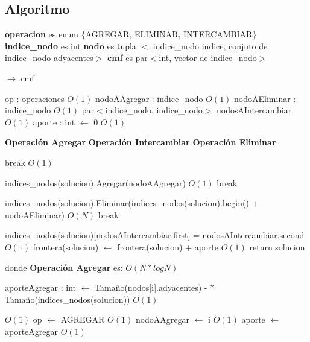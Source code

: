 \documentclass[a4paper, 10pt, twoside]{article}
\newenvironment{pseudo}[1][]{%
    \vspace{1em}%
    \begin{algorithmic}%
}
{%
    \end{algorithmic}%
    \vspace{1em}%
}
\newcommand{\Ode}[1]{\hfill $O(#1)$}
\begin{document}
\subsection{Algoritmo}

\begin{pseudo}

\State \textbf{operacion} es enum $\lbrace$AGREGAR, ELIMINAR, INTERCAMBIAR$\rbrace$
\State \textbf{indice\_nodo} es int
\State \textbf{nodo} es tupla $<$ indice\_nodo indice, conjuto de indice\_nodo adyacentes$>$
\State \textbf{cmf} es par$<$int, vector de indice\_nodo$>$

\State
{} $\rightarrow$ cmf
	
	\State op : operaciones 																	\Ode{1}
	\State nodoAAgregar	: indice\_nodo 															\Ode{1}
	\State nodoAEliminar : indice\_nodo															\Ode{1}
	\State par$<$indice\_nodo, indice\_nodo$>$ nodosAIntercambiar								\Ode{1}
	\State aporte : int  $\leftarrow$ 0															\Ode{1}

	\State
	\State \textbf{Operación Agregar}
	\State
	\State \textbf{Operación Intercambiar}
	\State
	\State \textbf{Operación Eliminar}
	\State

	 break \EndIf																\Ode{1}

		    \State indices\_nodos(solucion).Agregar(nodoAAgregar)								\Ode{1}
		    \State break
	    \EndCase

		    \State indices\_nodos(solucion).Eliminar(indices\_nodos(solucion).begin() + nodoAEliminar)	\Ode{N}
		    \State break
	    \EndCase

		    \State indices\_nodos(solucion)[nodosAIntercambiar.first] = nodosAIntercambiar.second	\Ode{1}
	    \EndCase
	\EndSwitch
	\State
	\State frontera(solucion) $\leftarrow$ frontera(solucion) + aporte 							\Ode{1}
	\State return solucion

\EndProcedure
\State
\State donde \textbf{Operación Agregar} es:
\State
											\Ode{N*log N}

				\State aporteAgregar : int $\leftarrow$ Tamaño(nodos[i].adyacentes) -
				 * Tamaño(indices\_nodos(solucion))															\Ode{1}

																						\Ode{1}
					\State op $\leftarrow$ AGREGAR 																	\Ode{1}
					\State nodoAAgregar $\leftarrow$ i 																\Ode{1}
					\State aporte $\leftarrow$ aporteAgregar														\Ode{1}
				\EndIf
			\EndIf
		\EndFor


\end{pseudo}
\end{document}
